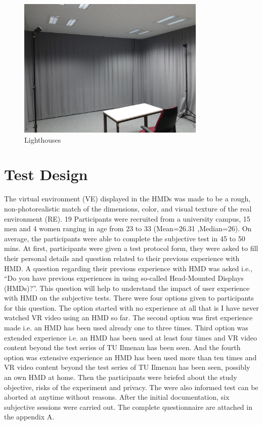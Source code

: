 \begin{figure}[h]
    \centering
    \includegraphics[width=0.8\textwidth]{./images/lighthouses1.jpeg}
    \caption{Lighthouses}
    \label{fig:lighthouses1}
\end{figure}
 



\chapter{Test Design}
\label{sec:Test Design}
The virtual environment (VE) displayed in the HMDs was made to be a rough, non-photorealistic
match of the dimensions, color, and visual texture of the real environment (RE). 19 Participants
were recruited from a university campus, 15 men and 4 women ranging in age from 23 to
33 (Mean=26.31 ,Median=26). On average, the participants were able to complete the subjective test in 45 to 50 mins.
At first, participants were given a test protocol form, they were asked to fill their personal details and question related to their previous experience with HMD. A question regarding their previous experience with HMD was asked i.e., “Do you have previous experiences in using so-called Head-Mounted Displays (HMDs)?”. This question will help to understand the impact of user experience with HMD on the subjective tests. There were four options given to participants for this question. The option started with no experience at all that is I have never watched VR video using an HMD so far. The second option was first experience made i.e. an HMD has been used already one to three times. Third option was extended experience i.e. an HMD has been used at least four times and VR video
content beyond the test series of TU Ilmenau has been seen. And the fourth option was extensive experience an HMD has been used more than ten times and VR video content beyond
the test series of TU Ilmenau has been seen, possibly an own HMD at home. Then the participants were briefed about the study objective, risks of the experiment and privacy.
The were also informed test can be aborted at anytime without reasons. After the initial documentation, six subjective sessions were carried out. The complete questionnaire are attached in the appendix A.
 


